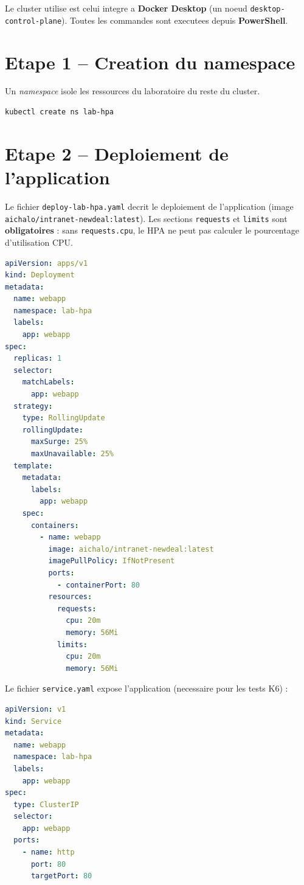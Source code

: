 \documentclass[11pt,a4paper]{report}
\begin{document}
Le cluster utilise est celui integre a \textbf{Docker Desktop} (un noeud
\texttt{desktop-control-plane}). Toutes les commandes sont executees depuis
\textbf{PowerShell}.

\section{Etape 1 -- Creation du namespace}

Un \emph{namespace} isole les ressources du laboratoire du reste du cluster.

\begin{lstlisting}[language=bash]
kubectl create ns lab-hpa
\end{lstlisting}

\section{Etape 2 -- Deploiement de l'application}

Le fichier \texttt{deploy-lab-hpa.yaml} decrit le deploiement de l'application
(image \texttt{aichalo/intranet-newdeal:latest}). Les sections \texttt{requests} et
\texttt{limits} sont \textbf{obligatoires} : sans \texttt{requests.cpu}, le HPA ne peut
pas calculer le pourcentage d'utilisation CPU.

\begin{lstlisting}[language=yaml]
apiVersion: apps/v1
kind: Deployment
metadata:
  name: webapp
  namespace: lab-hpa
  labels:
    app: webapp
spec:
  replicas: 1
  selector:
    matchLabels:
      app: webapp
  strategy:
    type: RollingUpdate
    rollingUpdate:
      maxSurge: 25%
      maxUnavailable: 25%
  template:
    metadata:
      labels:
        app: webapp
    spec:
      containers:
        - name: webapp
          image: aichalo/intranet-newdeal:latest
          imagePullPolicy: IfNotPresent
          ports:
            - containerPort: 80
          resources:
            requests:
              cpu: 20m
              memory: 56Mi
            limits:
              cpu: 20m
              memory: 56Mi
\end{lstlisting}

Le fichier \texttt{service.yaml} expose l'application (necessaire pour les tests K6) :

\begin{lstlisting}[language=yaml]
apiVersion: v1
kind: Service
metadata:
  name: webapp
  namespace: lab-hpa
  labels:
    app: webapp
spec:
  type: ClusterIP
  selector:
    app: webapp
  ports:
    - name: http
      port: 80
      targetPort: 80
\end{lstlisting}
\end{document}
